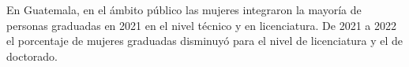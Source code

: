 En Guatemala, en el ámbito público las mujeres integraron la mayoría de personas graduadas en 2021 en el nivel técnico y en licenciatura. De 2021 a 2022 el porcentaje de mujeres graduadas disminuyó para el nivel de licenciatura y el de doctorado. 
